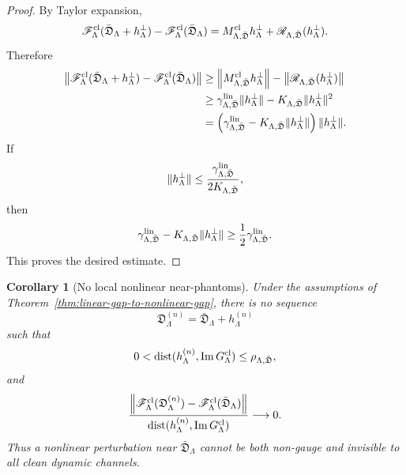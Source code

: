\documentclass[11pt]{article}
\numberwithin{equation}{section}
\newtheorem{corollary}[theorem]{Corollary}
\begin{document}
\begin{proof}
By Taylor expansion,
\[
        \mathscr F_\Lambda^{\rm cl}
        (\bar{\mathfrak D}_\Lambda+h_\Lambda^\perp)
        -
        \mathscr F_\Lambda^{\rm cl}(\bar{\mathfrak D}_\Lambda)
        =
        M_{\Lambda,\bar{\mathfrak D}}^{\rm cl}h_\Lambda^\perp
        +
        \mathscr R_{\Lambda,\bar{\mathfrak D}}(h_\Lambda^\perp).
\]
Therefore
\[
\begin{aligned}
        \left\|
        \mathscr F_\Lambda^{\rm cl}
        (\bar{\mathfrak D}_\Lambda+h_\Lambda^\perp)
        -
        \mathscr F_\Lambda^{\rm cl}(\bar{\mathfrak D}_\Lambda)
        \right\|
        &\ge
        \left\|
        M_{\Lambda,\bar{\mathfrak D}}^{\rm cl}h_\Lambda^\perp
        \right\|
        -
        \left\|
        \mathscr R_{\Lambda,\bar{\mathfrak D}}(h_\Lambda^\perp)
        \right\|                                      \\
        &\ge
        \gamma_{\Lambda,\bar{\mathfrak D}}^{\rm lin}
        \|h_\Lambda^\perp\|
        -
        K_{\Lambda,\bar{\mathfrak D}}
        \|h_\Lambda^\perp\|^2                         \\
        &=
        \left(
        \gamma_{\Lambda,\bar{\mathfrak D}}^{\rm lin}
        -
        K_{\Lambda,\bar{\mathfrak D}}\|h_\Lambda^\perp\|
        \right)
        \|h_\Lambda^\perp\|.
\end{aligned}
\]
If
\[
        \|h_\Lambda^\perp\|
        \le
        \frac{\gamma_{\Lambda,\bar{\mathfrak D}}^{\rm lin}}
        {2K_{\Lambda,\bar{\mathfrak D}}},
\]
then
\[
        \gamma_{\Lambda,\bar{\mathfrak D}}^{\rm lin}
        -
        K_{\Lambda,\bar{\mathfrak D}}\|h_\Lambda^\perp\|
        \ge
        \frac12
        \gamma_{\Lambda,\bar{\mathfrak D}}^{\rm lin}.
\]
This proves the desired estimate.
\end{proof}

\begin{corollary}[No local nonlinear near-phantoms]
\label{cor:no-local-nonlinear-near-phantoms}
Under the assumptions of
Theorem~\ref{thm:linear-gap-to-nonlinear-gap}, there is no sequence
\[
        \mathfrak D_\Lambda^{(n)}
        =
        \bar{\mathfrak D}_\Lambda+h_\Lambda^{(n)}
\]
such that
\[
        0<
        \operatorname{dist}
        (h_\Lambda^{(n)},\operatorname{Im}G_\Lambda^{\rm cl})
        \le
        \rho_{\Lambda,\bar{\mathfrak D}},
\]
and
\[
        \frac{
        \left\|
        \mathscr F_\Lambda^{\rm cl}
        (\mathfrak D_\Lambda^{(n)})
        -
        \mathscr F_\Lambda^{\rm cl}(\bar{\mathfrak D}_\Lambda)
        \right\|
        }
        {
        \operatorname{dist}
        (h_\Lambda^{(n)},\operatorname{Im}G_\Lambda^{\rm cl})
        }
        \longrightarrow 0 .
\]
Thus a nonlinear perturbation near \(\bar{\mathfrak D}_\Lambda\) cannot be
both non-gauge and invisible to all clean dynamic channels.
\end{corollary}
\end{document}
